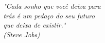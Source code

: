 \begin{epigrafe}
\vspace*{\fill}
\begin{flushright}
\textit{"Cada sonho que você deixa para \\trás é um pedaço do seu futuro\\que deixa de existir."
	 \\(Steve Jobs)}
\end{flushright}
\end{epigrafe}
